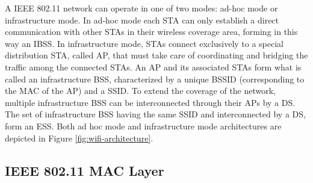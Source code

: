 A IEEE 802.11 network can operate in one of two modes: ad-hoc mode or infrastructure mode. In ad-hoc mode each \gls{STA} can only establish a direct communication with other \glspl{STA} in their wireless coverage area, forming in this way an \gls{IBSS}. In infrastructure mode, \glspl{STA} connect exclusively to a special distribution \gls{STA}, called \gls{AP}, that must take care of coordinating and bridging the traffic among the connected \glspl{STA}. An \gls{AP} and its associated \glspl{STA} form what is called an infrastructure \gls{BSS}, characterized by a unique \gls{BSSID} (corresponding to the MAC of the \gls{AP}) and a \gls{SSID}. To extend the coverage of the network, multiple infrastructure \gls{BSS} can be interconnected through their \glspl{AP} by a \gls{DS}. The set of infrastructure \gls{BSS} having the same \gls{SSID} and interconnected by a \gls{DS}, form an \gls{ESS}.
Both ad hoc mode and infrastructure mode architectures are depicted in Figure \ref{fig:wifi-architecture}.

\subsection{IEEE 802.11 MAC Layer}

